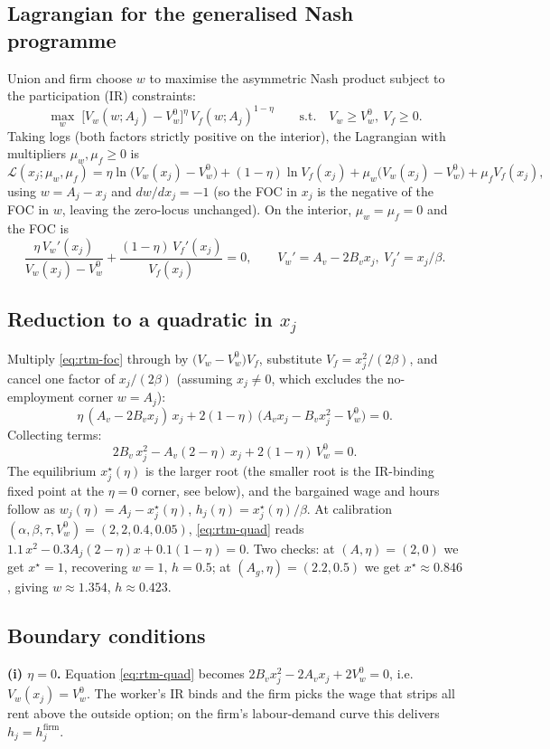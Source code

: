 \documentclass[a4paper,11pt]{article}
\begin{document}
\subsection{Lagrangian for the generalised Nash programme}
Union and firm choose $w$ to maximise the asymmetric Nash product subject to the participation (IR) constraints:
\[
\max_{w}\;\bigl[V_w(w;A_j)-V_w^{0}\bigr]^{\eta}\,V_f(w;A_j)^{1-\eta}\qquad\text{s.t.}\quad V_w\ge V_w^{0},\ V_f\ge 0.
\]
Taking logs (both factors strictly positive on the interior), the Lagrangian with multipliers $\mu_w,\mu_f\ge 0$ is
\[
\mathcal{L}(x_j;\mu_w,\mu_f)
=\eta\ln\!\bigl(V_w(x_j)-V_w^{0}\bigr)+(1-\eta)\ln V_f(x_j)+\mu_w\bigl(V_w(x_j)-V_w^{0}\bigr)+\mu_f V_f(x_j),
\]
using $w=A_j-x_j$ and $dw/dx_j=-1$ (so the FOC in $x_j$ is the negative of the FOC in $w$, leaving the zero-locus unchanged). On the interior, $\mu_w=\mu_f=0$ and the FOC is
\begin{equation}
\frac{\eta\,V_w'(x_j)}{V_w(x_j)-V_w^{0}}+\frac{(1-\eta)\,V_f'(x_j)}{V_f(x_j)}=0,\qquad V_w'=A_v-2B_vx_j,\ V_f'=x_j/\beta.
\label{eq:rtm-foc}
\end{equation}

\subsection{Reduction to a quadratic in $x_j$}
Multiply \eqref{eq:rtm-foc} through by $\bigl(V_w-V_w^{0}\bigr)V_f$, substitute $V_f=x_j^{2}/(2\beta)$, and cancel one factor of $x_j/(2\beta)$ (assuming $x_j\!\neq\!0$, which excludes the no-employment corner $w=A_j$):
\[
\eta\,(A_v-2B_vx_j)\,x_j+2(1-\eta)\,\bigl(A_vx_j-B_vx_j^{2}-V_w^{0}\bigr)=0.
\]
Collecting terms:
\begin{equation}
2B_v\,x_j^{2}-A_v(2-\eta)\,x_j+2(1-\eta)\,V_w^{0}=0.
\label{eq:rtm-quad}
\end{equation}
The equilibrium $x_j^{\star}(\eta)$ is the larger root (the smaller root is the IR-binding fixed point at the $\eta\!=\!0$ corner, see below), and the bargained wage and hours follow as $w_j(\eta)=A_j-x_j^{\star}(\eta)$, $h_j(\eta)=x_j^{\star}(\eta)/\beta$. At calibration $(\alpha,\beta,\tau,V_w^{0})=(2,2,0.4,0.05)$, \eqref{eq:rtm-quad} reads $1.1\,x^{2}-0.3A_j(2-\eta)x+0.1(1-\eta)=0$. Two checks: at $(A,\eta)=(2,0)$ we get $x^{\star}=1$, recovering $w=1,\,h=0.5$; at $(A_g,\eta)=(2.2,0.5)$ we get $x^{\star}\!\approx\!0.846$, giving $w\!\approx\!1.354$, $h\!\approx\!0.423$.

\subsection{Boundary conditions}
\textbf{(i) $\eta=0$.} Equation \eqref{eq:rtm-quad} becomes $2B_vx_j^{2}-2A_vx_j+2V_w^{0}=0$, i.e.\ $V_w(x_j)=V_w^{0}$. The worker's IR binds and the firm picks the wage that strips all rent above the outside option; on the firm's labour-demand curve this delivers $h_j=h^{\mathrm{firm}}_j$.
\end{document}
